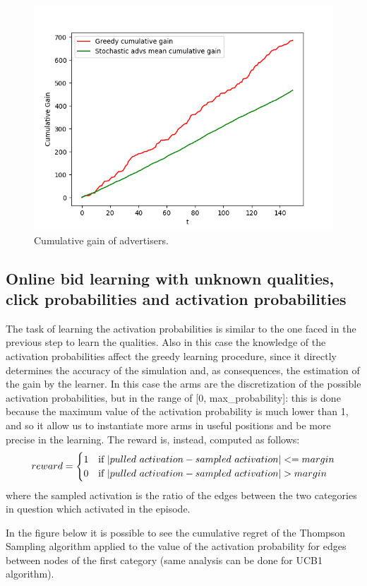 \documentclass{article}
\begin{document}
\begin{figure}[H]
    \centering
    \includegraphics[width=0.55\linewidth]{images/greedy-vs-stochastics.png}
    \caption{Cumulative gain of advertisers.}
\end{figure}

\subsection{Online bid learning with unknown qualities, click probabilities and activation probabilities}

The task of learning the activation probabilities is similar to the one faced in the previous step to learn the qualities. Also in this case the knowledge of the activation probabilities affect the greedy learning procedure, since it directly determines the accuracy of the simulation and, as consequences, the estimation of the gain by the learner.
In this case the arms are the discretization of the possible activation probabilities, but in the range of [0, max\_probability]: this is done because the maximum value of the activation probability is much lower than 1, and so it allow us to instantiate more arms in useful positions and be more precise in the learning. The reward is, instead, computed as follows:
\[ reward = \begin{cases} 
      1 & $if $ \vert pulled$ $activation - sampled$ $activation \vert  <= margin \\
      0 & $if $ \vert pulled$ $activation - sampled$ $activation \vert  > margin
\end{cases} \]
where the sampled activation is the ratio of the edges between the two categories in question which activated in the episode.

In the figure below it is possible to see the cumulative regret of the Thompson Sampling algorithm applied to the value of the activation probability for edges between nodes of the first category (same analysis can be done for UCB1 algorithm).
\end{document}
